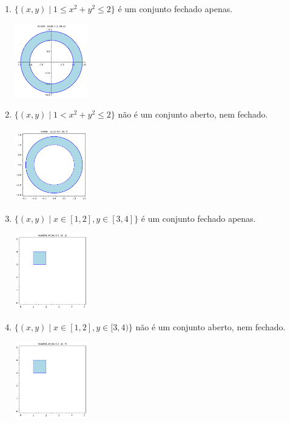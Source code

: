 \documentclass[../main.tex]{subfiles}
\begin{document}
\begin{solucao}
\begin{enumerate}[label=\alph*)]
\begin{center}
				\end{center}
				\item $\{(x,y) \mid 1\leq x^2+y^2\leq2\}$ é um conjunto fechado apenas.
				\begin{center}
					\includegraphics[width=0.25\textwidth]{imagens/lista03/picture_lista03.02_q03_item05.png}
				\end{center}
				\item $\{(x,y) \mid 1< x^2+y^2\leq2\}$ não é um conjunto aberto, nem fechado.
				\begin{center}
					\includegraphics[width=0.25\textwidth]{imagens/lista03/picture_lista03.02_q03_item06.png}
				\end{center}
				\item $\{(x,y) \mid x\in [1,2], y\in [3,4]\}$ é um conjunto fechado apenas.
				\begin{center}
					\includegraphics[width=0.25\textwidth]{imagens/lista03/picture_lista03.02_q03_item07.png}
				\end{center}
				\item $\{(x,y) \mid x\in [1,2], y\in [3,4)\}$ não é um conjunto aberto, nem fechado.
				\begin{center}
					\includegraphics[width=0.25\textwidth]{imagens/lista03/picture_lista03.02_q03_item08.png}

\end{center}
\end{enumerate}
\end{solucao}
\end{document}
